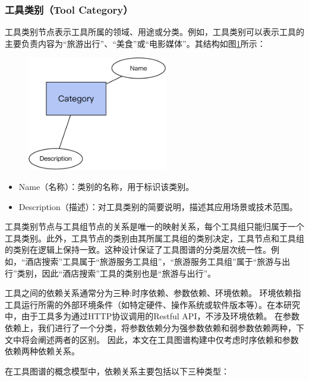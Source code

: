 \subsubsection{工具类别（Tool Category）}
工具类别节点表示工具所属的领域、用途或分类。例如，工具类别可以表示工具的主要负责内容为“旅游出行”、“美食”或“电影媒体”。其结构如图\ref{fig:ch3-kg-category}所示：

\begin{figure}[H]
    \vspace{1em}
    \centering
    \setlength{\abovecaptionskip}{10pt} %
    \includegraphics[height=5cm]{../assets/图谱格式-category.pdf}
    \label{fig:ch3-kg-category}
  \end{figure}

\begin{itemize}
    \item Name（名称）：类别的名称，用于标识该类别。
    \item Description（描述）：对工具类别的简要说明，描述其应用场景或技术范围。
\end{itemize}

工具类别节点与工具组节点的关系是唯一的映射关系，每个工具组只能归属于一个工具类别。此外，工具节点的类别由其所属工具组的类别决定，工具节点和工具组的类别在逻辑上保持一致。这种设计保证了工具图谱的分类层次统一性。例如，“酒店搜索”工具属于“旅游服务工具组”，“旅游服务工具组”属于“旅游与出行”类别，因此“酒店搜索”工具的类别也是“旅游与出行”。

工具之间的依赖关系通常分为三种\cite{shen2023taskbench}:时序依赖、参数依赖、环境依赖。
环境依赖指工具运行所需的外部环境条件（如特定硬件、操作系统或软件版本等）。在本研究中，由于工具多为通过HTTP协议调用的Restful API，不涉及环境依赖。
在参数依赖上，我们进行了一个分类，将参数依赖分为强参数依赖和弱参数依赖两种，下文中将会阐述两者的区别。
因此，本文在工具图谱构建中仅考虑时序依赖和参数依赖两种依赖关系。

在工具图谱的概念模型中，依赖关系主要包括以下三种类型：

